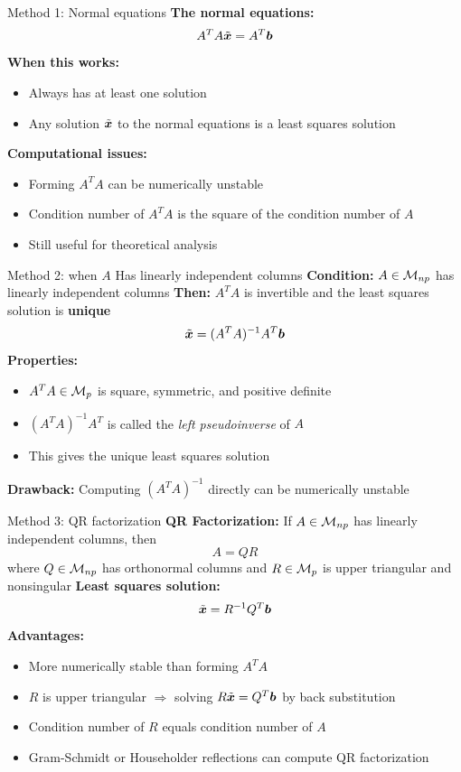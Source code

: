 \documentclass[aspectratio=169]{beamer}\usepackage[]{graphicx}\usepackage[]{xcolor}
\begin{document}
\begin{frame}{Method 1: Normal equations}
\textbf{The normal equations:}
$$A^TA\tilde{\bm{x}} = A^T\bm{b}$$
\vfill
\textbf{When this works:}
\begin{itemize}
\item Always has at least one solution
\item Any solution $\tilde{\bm{x}}$ to the normal equations is a least squares solution
\end{itemize}
\vfill
\textbf{Computational issues:}
\begin{itemize}
\item Forming $A^TA$ can be numerically unstable
\item Condition number of $A^TA$ is the square of the condition number of $A$
\item Still useful for theoretical analysis
\end{itemize}
\end{frame}

\begin{frame}{Method 2: when $A$ Has linearly independent columns}
\textbf{Condition:} $A\in\mathcal{M}_{np}$ has linearly independent columns
\vfill
\textbf{Then:} $A^TA$ is invertible and the least squares solution is \textbf{unique}
$$\tilde{\bm{x}} = (A^TA)^{-1}A^T\bm{b}$$
\vfill
\textbf{Properties:}
\begin{itemize}
\item $A^TA \in \mathcal{M}_p$ is square, symmetric, and positive definite
\item $(A^TA)^{-1}A^T$ is called the \emph{left pseudoinverse} of $A$
\item This gives the unique least squares solution
\end{itemize}
\vfill
\textbf{Drawback:} Computing $(A^TA)^{-1}$ directly can be numerically unstable
\end{frame}

\begin{frame}{Method 3: QR factorization}
\textbf{QR Factorization:} If $A\in\mathcal{M}_{np}$ has linearly independent columns, then
$$A = QR$$
where $Q\in\mathcal{M}_{np}$ has orthonormal columns and $R\in\mathcal{M}_p$ is upper triangular and nonsingular
\vfill
\textbf{Least squares solution:}
$$\tilde{\bm{x}} = R^{-1}Q^T\bm{b}$$
\vfill
\textbf{Advantages:}
\begin{itemize}
\item More numerically stable than forming $A^TA$
\item $R$ is upper triangular $\Rightarrow$ solving $R\tilde{\bm{x}} = Q^T\bm{b}$ by back substitution
\item Condition number of $R$ equals condition number of $A$
\item Gram-Schmidt or Householder reflections can compute QR factorization
\end{itemize}
\end{frame}
\end{document}
